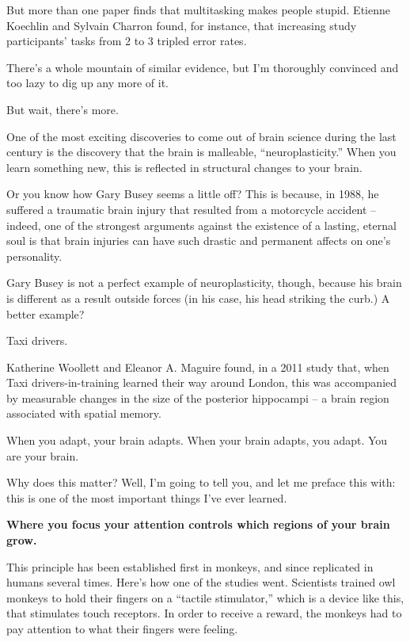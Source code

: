 But more than one paper finds that multitasking makes people stupid. Etienne
Koechlin and Sylvain Charron found, for instance, that increasing study
participants' tasks from 2 to 3 tripled error rates. \cite{charron2010divided}

There's a whole mountain of similar evidence, but I'm thoroughly convinced and
too lazy to dig up any more of it.

But wait, there's more.

One of the most exciting discoveries to come out of brain science during the
last century is the discovery that the brain is malleable, ``neuroplasticity.''
When you learn something new, this is reflected in structural changes to your
brain.

Or you know how Gary Busey seems a little off? This is because, in 1988, he
suffered a traumatic brain injury that resulted from a motorcycle accident --
indeed, one of the strongest arguments against the existence of a lasting, eternal soul
is that brain injuries can have such drastic and permanent affects on one's
personality.

Gary Busey is not a perfect example of neuroplasticity, though, because his
brain is different as a result outside forces (in his case, his head striking
the curb.) A better example?

Taxi drivers.

Katherine Woollett and Eleanor A. Maguire found, in a 2011 study that, when Taxi
drivers-in-training learned their way around London, this was accompanied by
measurable changes in the size of the posterior hippocampi -- a brain region
associated with spatial memory.

When you adapt, your brain adapts. When your brain adapts, you adapt. You are
your brain.

Why does this matter? Well, I'm going to tell you, and let me preface this with:
this is one of the most important things I've ever learned.

\textbf{Where you focus your attention controls which regions of your brain
  grow.}

This principle has been established first in monkeys, and since replicated
in humans several times.\cite{heron2010attention}\cite{stefan2004modulation} Here's how one of the studies\cite{recanzone1992topographic} went. Scientists trained owl
monkeys to hold their fingers on a ``tactile stimulator,'' which is a device like
this, that stimulates touch receptors. In order to receive a reward, the monkeys
had to pay attention to what their fingers were feeling.

